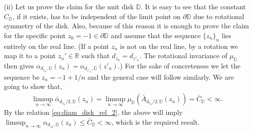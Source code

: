 \documentclass[a4paper, 11pt, reqno]{amsart}
\theoremstyle{definition} \newtheorem{defn}{Definition}[section]
\theoremstyle{remark} \newtheorem{rem}[defn]{Remark}
\theoremstyle{remark} \newtheorem*{rem*}{Remark}
\theoremstyle{plain} \newtheorem{thm}[defn]{Theorem}
\theoremstyle{plain} \newtheorem{lem}[defn]{Lemma}
\theoremstyle{plain} \newtheorem{prop}[defn]{Proposition}
\theoremstyle{plain} \newtheorem{cor}[defn]{Corollary}
\theoremstyle{remark} \newtheorem{exm}[defn]{\textbf{Example}}
\theoremstyle{remark} \newtheorem{exms}[defn]{\textbf{Examples}}
\theoremstyle{remark} \newtheorem*{bl}{}
\numberwithin{equation}{section} %
\newcommand{\D}{\mathbb{D}}
\newcommand{\R}{\mathbb{R}}
\begin{document}
        (ii) Let us prove the claim for the unit disk $\D$. It is easy to see that the constant $C_{\D}$, if it exists, has to be independent of the limit point on $\partial \D$ due to rotational symmetry of the disk. Also, because of this reason it is enough to prove the claim for the specific point $z_0=-1 \in \partial \D$ and assume that the sequence $\{z_n\}_n$ lies entirely on the real line. (If a point $z_n$ is not on the real line, by a rotation we map it to a point $z_n' \in \R$ such that $d_{z_n} = d_{z'_n}$. The rotational invariance of $\mu_{\D}$ then gives $\alpha_{d_{z_n}, \D}(z_n) = \alpha_{d_{z'_n}, \D}(z'_n)$.) For the sake of concreteness we let the sequence be $z_n = -1+1/n$ and the general case will follow similarly. We are going to show that, 
         \begin{align}\label{eq:alpha_D_near_bdry_0}
            \limsup_{n\to \infty }\bar{\alpha}_{d_{z_n}/2, \D} (z_n) = \limsup_{n\to \infty } \mu_{\D} (\bar{A}_{d_{z_n}/2, \D} (z_n)) = \bar{C}_{\D}< \infty.
        \end{align}
        By the relation \eqref{eq:diam_disk_rel_2}, the above will imply $\limsup_{n \to \infty} \alpha_{d_{z_n}, \D} (z_n) \le \bar{C}_{\D} < \infty$, which is the required result. 
         
\end{document}
